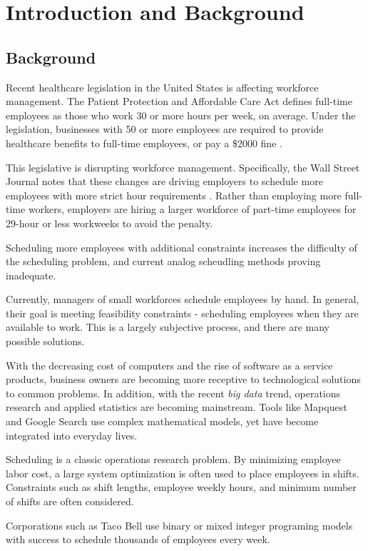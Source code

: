 \chapter{Introduction and Background}

\section{Background}
Recent healthcare legislation in the United States is affecting workforce management. The Patient Protection and Affordable Care Act defines full-time employees as those who work 30 or more hours per week, on average. Under the legislation, businesses with 50 or more employees are required to provide healthcare benefits to full-time employees, or pay a \$2000 fine \cite{ppaca}. 

This legislative is disrupting workforce management. Specifically, the Wall Street Journal  notes that these changes are driving employers to schedule more employees with more strict hour requirements \cite{wsj}. Rather than employing more full-time workers, employers are hiring a larger workforce of part-time employees for 29-hour or less workweeks to avoid the  penalty. 

Scheduling more employees with additional constraints increases the difficulty of the scheduling problem, and current analog scheudling methods proving inadequate.

Currently, managers of small workforces schedule employees by hand. In general, their goal is meeting feasibility constraints - scheduling employees when they are available to work. This is a largely subjective process, and there are many possible solutions. 

With the decreasing cost of computers and the rise of software as a service products, business owners are becoming more receptive to technological solutions to common problems. In addition, with the recent \emph{big data} trend, operations research and applied statistics are becoming mainstream. Tools like Mapquest and Google Search use complex mathematical models, yet have become integrated into everyday lives.

Scheduling is a classic operations research problem. By minimizing employee labor cost, a large system optimization is often used to place employees in shifts. Constraints such as shift lengths, employee weekly hours, and minimum number of shifts are often considered. 

Corporations such as Taco Bell  use binary or mixed integer programing models \cite{taco} with success to schedule thousands of employees every week. 

